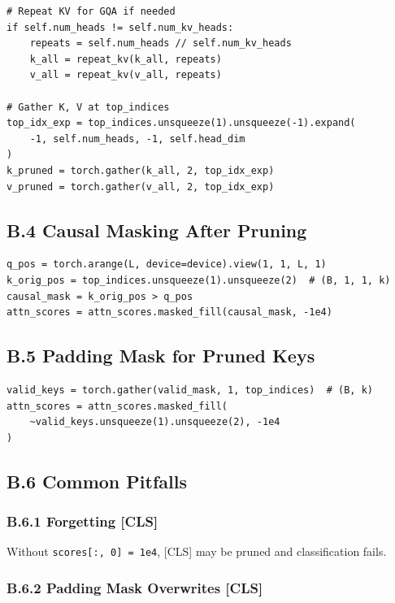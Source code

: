 \begin{lstlisting}
# Repeat KV for GQA if needed
if self.num_heads != self.num_kv_heads:
    repeats = self.num_heads // self.num_kv_heads
    k_all = repeat_kv(k_all, repeats)
    v_all = repeat_kv(v_all, repeats)

# Gather K, V at top_indices
top_idx_exp = top_indices.unsqueeze(1).unsqueeze(-1).expand(
    -1, self.num_heads, -1, self.head_dim
)
k_pruned = torch.gather(k_all, 2, top_idx_exp)
v_pruned = torch.gather(v_all, 2, top_idx_exp)
\end{lstlisting}

\subsection{B.4 Causal Masking After Pruning}

\begin{lstlisting}
q_pos = torch.arange(L, device=device).view(1, 1, L, 1)
k_orig_pos = top_indices.unsqueeze(1).unsqueeze(2)  # (B, 1, 1, k)
causal_mask = k_orig_pos > q_pos
attn_scores = attn_scores.masked_fill(causal_mask, -1e4)
\end{lstlisting}

\subsection{B.5 Padding Mask for Pruned Keys}

\begin{lstlisting}
valid_keys = torch.gather(valid_mask, 1, top_indices)  # (B, k)
attn_scores = attn_scores.masked_fill(
    ~valid_keys.unsqueeze(1).unsqueeze(2), -1e4
)
\end{lstlisting}

\subsection{B.6 Common Pitfalls}

\subsubsection{B.6.1 Forgetting [CLS]}

Without \texttt{scores[:, 0] = 1e4}, [CLS] may be pruned and classification fails.

\subsubsection{B.6.2 Padding Mask Overwrites [CLS]}

